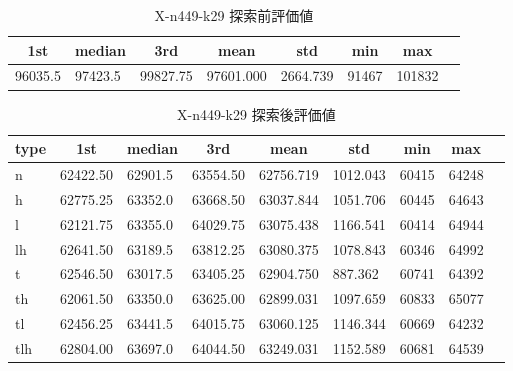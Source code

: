 \begin{table}[htbp]
    \caption{X-n449-k29 探索前評価値}
    \begin{tabular}{|l|l|l|l|l|l|l|l|}\hline
    \multicolumn{1}{|c|}{\textbf{1st}}
    &\multicolumn{1}{c|}{\textbf{median}}
    &\multicolumn{1}{c|}{\textbf{3rd}}
    &\multicolumn{1}{c|}{\textbf{mean}}
    &\multicolumn{1}{c|}{\textbf{std}}
    &\multicolumn{1}{c|}{\textbf{min}}
    &\multicolumn{1}{c|}{\textbf{max}}\\\hline
	96035.5 & 97423.5 & 99827.75 & 97601.000 & 2664.739 & 91467 & 101832\\\hline
	\end{tabular}
\end{table}
\begin{table}[htbp]
    \caption{X-n449-k29 探索後評価値}
    \begin{tabular}{|l|l|l|l|l|l|l|l|l|}\hline
    \multicolumn{1}{|c|}{\textbf{type}}
    &\multicolumn{1}{|c|}{\textbf{1st}}
    &\multicolumn{1}{c|}{\textbf{median}}
    &\multicolumn{1}{c|}{\textbf{3rd}}
    &\multicolumn{1}{c|}{\textbf{mean}}
    &\multicolumn{1}{c|}{\textbf{std}}
    &\multicolumn{1}{c|}{\textbf{min}}
    &\multicolumn{1}{c|}{\textbf{max}}\\\hline
	n & 62422.50 & 62901.5 & 63554.50 & 62756.719 & 1012.043 & 60415 & 64248\\\hline
	h & 62775.25 & 63352.0 & 63668.50 & 63037.844 & 1051.706 & 60445 & 64643\\\hline
	l & 62121.75 & 63355.0 & 64029.75 & 63075.438 & 1166.541 & 60414 & 64944\\\hline
	lh & 62641.50 & 63189.5 & 63812.25 & 63080.375 & 1078.843 & 60346 & 64992\\\hline
	t & 62546.50 & 63017.5 & 63405.25 & 62904.750 & 887.362 & 60741 & 64392\\\hline
	th & 62061.50 & 63350.0 & 63625.00 & 62899.031 & 1097.659 & 60833 & 65077\\\hline
	tl & 62456.25 & 63441.5 & 64015.75 & 63060.125 & 1146.344 & 60669 & 64232\\\hline
	tlh & 62804.00 & 63697.0 & 64044.50 & 63249.031 & 1152.589 & 60681 & 64539\\\hline
	\end{tabular}
\end{table}
